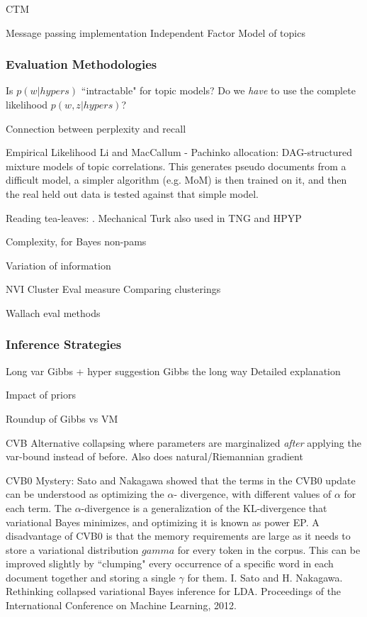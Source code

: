 \documentclass[10pt,fleqn]{article}
\begin{document}
CTM \cite{Blei2006}

Message passing implementation\cite{Ahmed2006}
Independent Factor Model of topics\cite{Putthividhya2009}

\subsubsection{Evaluation Methodologies}

Is $p(w|hypers)$ ``intractable" for topic models? Do we \emph{have} to use the complete likelihood $p(w,z|hypers)$?

Connection between perplexity and recall \cite{Azzopardi2003}

Empirical Likelihood Li and MacCallum - Pachinko allocation: DAG-structured mixture models of topic correlations. This generates pseudo documents from a difficult model, a simpler algorithm (e.g. MoM) is then trained on it, and then the real held out data is tested against that simple model.

Reading tea-leaves: \cite{Chang2009}. Mechanical Turk also used in TNG\cite{Wang2007} and HPYP\cite{Lindsey2012}

Complexity, for Bayes non-pams\cite{Kim2011}

Variation of information\cite{Meila2003}

NVI Cluster Eval measure\cite{Reichart2009}
Comparing clusterings\cite{Wagner2007}

Wallach eval methods\cite{Wallach2009}

\subsubsection{Inference Strategies}

Long var\cite{BleiNgJordan2003}
Gibbs + hyper suggestion \cite{Griffiths2004} Gibbs the long way\cite{Pritchard2000}
Detailed explanation \cite{Heinrich2005}

Impact of priors\cite{Wallach2009a}

Roundup of Gibbs vs VM \cite{Asuncion2012}


CVB \cite{Teh2007}
Alternative collapsing \cite{Hensman2012} where parameters are marginalized \emph{after} applying the var-bound instead of before. Also does natural/Riemannian gradient

CVB0 Mystery: Sato and Nakagawa  showed that the terms in the CVB0 update can be understood as optimizing the $\alpha$- divergence, with different values of $\alpha$ for each term. The $\alpha$-divergence is a generalization of the KL-divergence that variational Bayes minimizes, and optimizing it is known as power EP. A disadvantage of CVB0 is that the memory requirements are large as it needs to store a variational distribution $gamma$ for every token in the corpus. This can be improved slightly by ``clumping" every occurrence of a specific word in each document together and storing a single $\gamma$ for them. I. Sato and H. Nakagawa. Rethinking collapsed variational Bayes inference for LDA. Proceedings of the International Conference on Machine Learning, 2012.
\end{document}
